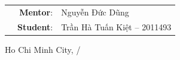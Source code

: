 \documentclass[12pt,a4paper]{article}
\begin{document}
\begin{titlepage}
    \vspace{1cm}
    \begin{table}[H]
        \begin{tabular}{rrl}
        \hspace{5 cm} & \textbf{Mentor}: & Nguyễn Đức Dũng\\
        
        & \textbf{Student}: & Trần Hà Tuấn Kiệt -- 2011493 \\
        
        \end{tabular}
        \end{table}
    \vspace{1cm}

    \begin{center}
        {\large Ho Chi Minh City, \the\month/\the\year}
    \end{center}
\end{titlepage}

\newpage
\end{document}
